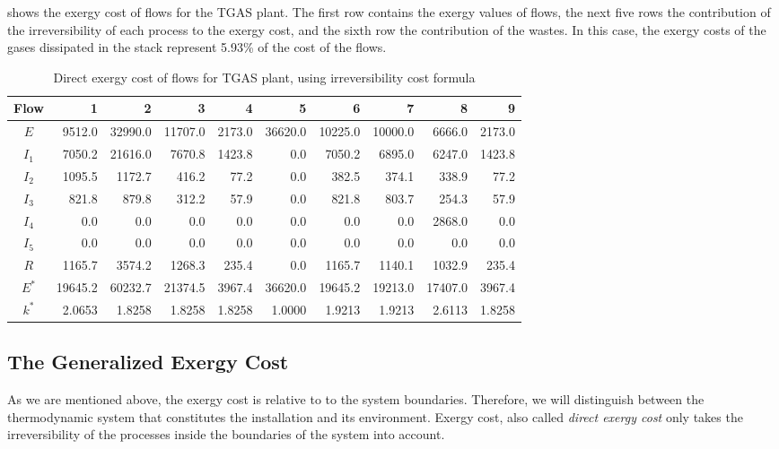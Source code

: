 \documentclass{ecos2018}
\begin{document}
 shows the exergy cost of flows for the TGAS plant.
The first row contains the exergy values of flows, the next five rows the contribution of the irreversibility of each process to the exergy cost, and the sixth row the contribution of the wastes. In this case, the exergy costs of the gases dissipated in the stack represent 5.93\% of the cost of the flows.
\newpage
\begin{table}[H]
	\small
	\caption{Direct exergy cost of flows for TGAS plant, using irreversibility cost formula}
	\begin{tabular}{crrrrrrrrr}
		\toprule
		Flow & 1 & 2 & 3 & 4 & 5 & 6 & 7 & 8 & 9 \\
		\midrule
		$E$     & 9512.0 & 32990.0 & 11707.0 & 2173.0 & 36620.0 & 10225.0 & 10000.0 & 6666.0 & 2173.0 \\
		\midrule
		$I_1$    & 7050.2 & 21616.0 & 7670.8 & 1423.8 & 0.0   & 7050.2 & 6895.0 & 6247.0 & 1423.8 \\
		$I_2$    & 1095.5 & 1172.7 & 416.2 & 77.2  & 0.0   & 382.5 & 374.1 & 338.9 & 77.2 \\
		$I_3$    & 821.8 & 879.8 & 312.2 & 57.9  & 0.0   & 821.8 & 803.7 & 254.3 & 57.9 \\
		$I_4$    & 0.0   & 0.0   & 0.0   & 0.0   & 0.0   & 0.0   & 0.0   & 2868.0 & 0.0 \\
		$I_5$    & 0.0   & 0.0   & 0.0   & 0.0   & 0.0   & 0.0   & 0.0   & 0.0   & 0.0 \\
		$R$     & 1165.7 & 3574.2 & 1268.3 & 235.4 & 0.0   & 1165.7 & 1140.1 & 1032.9 & 235.4 \\
		\midrule
		$E^*$ & 19645.2 & 60232.7 & 21374.5 & 3967.4 & 36620.0 & 19645.2 & 19213.0 & 17407.0 & 3967.4 \\
		\midrule
		$k^*$ & 2.0653  & 1.8258	& 1.8258  &	1.8258 & 1.0000	& 1.9213 & 1.9213 & 2.6113 & 1.8258 \\
		\bottomrule
	\end{tabular}%
	\label{tab4}%
\end{table}%

\subsection{The Generalized Exergy Cost}
As we are mentioned above, the exergy cost is relative to  to the system boundaries.
Therefore, we will distinguish between the thermodynamic system that constitutes the installation and its environment. Exergy cost, also called \emph{direct exergy cost} only takes the irreversibility of the processes inside the boundaries of the system into account.
\end{document}
